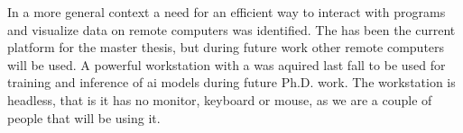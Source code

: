 In a more general context a need for an efficient way to interact with programs and visualize data on remote computers was identified.
The \jx has been the current platform for the master thesis, but during future work other remote computers will be used.
A powerful workstation with a \todo was aquired last fall to be used for training and inference of \gls{ai} models during future Ph.D.
work.
The workstation is headless, that is it has no monitor, keyboard or mouse, as we are a couple of people that will be using it.